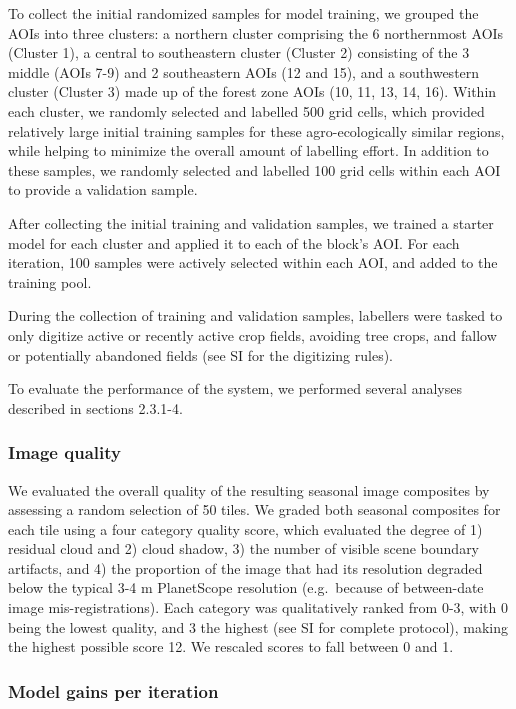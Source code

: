 \documentclass[11pt,a4paper]{article}
\begin{document}
To collect the initial randomized samples for model training, we grouped
the AOIs into three clusters: a northern cluster comprising the 6
northernmost AOIs (Cluster 1), a central to southeastern cluster
(Cluster 2) consisting of the 3 middle (AOIs 7-9) and 2 southeastern
AOIs (12 and 15), and a southwestern cluster (Cluster 3) made up of the
forest zone AOIs (10, 11, 13, 14, 16). Within each cluster, we randomly
selected and labelled 500 grid cells, which provided relatively large
initial training samples for these agro-ecologically similar regions,
while helping to minimize the overall amount of labelling effort. In
addition to these samples, we randomly selected and labelled 100 grid
cells within each AOI to provide a validation sample.

After collecting the initial training and validation samples, we trained
a starter model for each cluster and applied it to each of the block's
AOI. For each iteration, 100 samples were actively selected within each
AOI, and added to the training pool.

During the collection of training and validation samples, labellers were
tasked to only digitize active or recently active crop fields, avoiding
tree crops, and fallow or potentially abandoned fields (see SI for the
digitizing rules).

To evaluate the performance of the system, we performed several analyses
described in sections 2.3.1-4.

\hypertarget{image-quality}{%
\subsubsection{Image quality}\label{image-quality}}

We evaluated the overall quality of the resulting seasonal image
composites by assessing a random selection of 50 tiles. We graded both
seasonal composites for each tile using a four category quality score,
which evaluated the degree of 1) residual cloud and 2) cloud shadow, 3)
the number of visible scene boundary artifacts, and 4) the proportion of
the image that had its resolution degraded below the typical 3-4 m
PlanetScope resolution (e.g.~because of between-date image
mis-registrations). Each category was qualitatively ranked from 0-3,
with 0 being the lowest quality, and 3 the highest (see SI for complete
protocol), making the highest possible score 12. We rescaled scores to
fall between 0 and 1.

\hypertarget{model-gains-per-iteration}{%
\subsubsection{Model gains per
iteration}\label{model-gains-per-iteration}}
\end{document}

